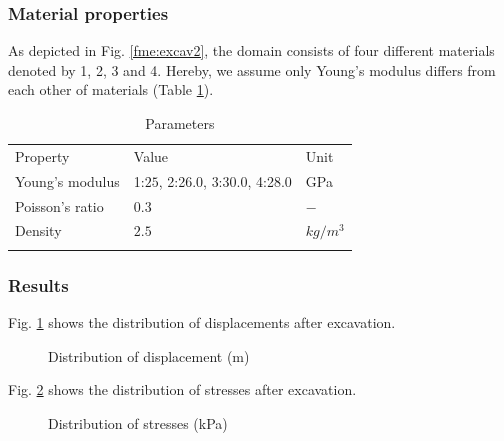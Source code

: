 \subsubsection*{Material properties}
As depicted in Fig. \ref{fme:excav2}, the domain  consists of four different materials denoted
    by 1, 2, 3 and 4. Hereby, we assume only Young's modulus differs from each other of materials
    (Table \ref{tme:el2dHR}).
 \begin{table}[!htb]
\centering
\begin{tabular}{lll}
\hline\hline\noalign{\smallskip}
Property & Value & Unit \\
\noalign{\smallskip}\hline\noalign{\smallskip}
Young's modulus & {\color{red}1:}$25$, {\color{red}2:}26.0, {\color{red}3:}30.0,
   {\color{red}4:}28.0  &GPa \\
Poisson's ratio & $0.3$             & $-$ \\
Density & $2.5$             & $kg/m^3$ \\
\noalign{\smallskip}\hline\hline
\end{tabular}
\caption{Parameters}
\label{tme:el2dHR}
\end{table}

\subsubsection*{Results}

Fig. \ref{fme:exH_disp} shows the distribution of displacements after excavation.
 \begin{figure}[!thb]
  \begin{center}
  \end{center}
  \caption{Distribution of displacement (m)}
  \label{fme:exH_disp}
\end{figure}

\clearpage

Fig. \ref{fme:exH_stress} shows the distribution of stresses after excavation.
 \begin{figure}[!thb]
  \begin{center}
  \end{center}
  \caption{Distribution of stresses (kPa)}
  \label{fme:exH_stress}
\end{figure}

